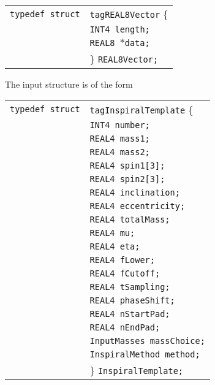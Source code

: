 \documentclass[12pt]{article}
\begin{document}
\begin{tabular}{ll}
\texttt{typedef struct} & \texttt{tagREAL8Vector} \{ \\
                        & \texttt{INT4 length;} \\
                        & \texttt{REAL8 $\ast$data;}  \\
                        & \} \texttt{REAL8Vector;}
\end{tabular}

\vspace{5mm}

\vspace{5mm}


The input structure is of the form

\vspace{5mm}

\begin{tabular}{ll}
\texttt{typedef struct} & \texttt{tagInspiralTemplate} \{ \\
                        & \texttt{INT4 number;} \\
                        & \texttt{REAL4 mass1;} \\
                        & \texttt{REAL4 mass2;}  \\
                        & \texttt{REAL4 spin1[3];}  \\
                        & \texttt{REAL4 spin2[3];}  \\
                        & \texttt{REAL4 inclination;} \\
                        & \texttt{REAL4 eccentricity;} \\
                        & \texttt{REAL4 totalMass;} \\
                        & \texttt{REAL4 mu;}  \\
                        & \texttt{REAL4 eta;}  \\
                        & \texttt{REAL4 fLower;}  \\
                        & \texttt{REAL4 fCutoff;} \\
                        & \texttt{REAL4 tSampling;} \\
                        & \texttt{REAL4 phaseShift;} \\
                        & \texttt{REAL4 nStartPad;} \\
                        & \texttt{REAL4 nEndPad;} \\
                        & \texttt{InputMasses massChoice;}  \\
                        & \texttt{InspiralMethod method;}  \\
                        & \} \texttt{InspiralTemplate;}
\end{tabular}
\end{document}
